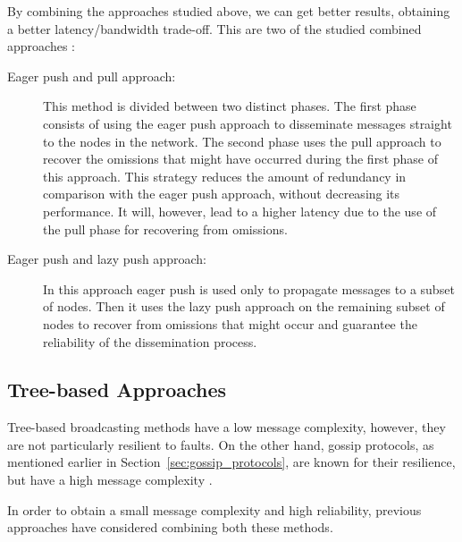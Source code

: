 By combining the approaches studied above, we can get better results, obtaining a better
latency/bandwidth trade-off. This are two of the studied combined approaches \cite{Carvalho2007}:
\begin{description}
      \item[Eager push and pull approach:] This method is divided between two distinct phases.
            The first phase consists of using the eager push approach to disseminate messages
            straight to the nodes in the network. The second phase uses the pull approach to
            recover the omissions that might have occurred during the first phase of this
            approach. This strategy reduces the amount of redundancy in comparison with the
            eager push approach, without decreasing its performance. It will, however, lead to
            a higher latency due to the use of the pull phase for recovering from omissions.
      \item[Eager push and lazy push approach:] In this approach eager push is used only to
            propagate messages to a subset of nodes. Then it uses the lazy push approach on
            the remaining subset of nodes to recover from omissions that might occur and
            guarantee the reliability of the dissemination process.
\end{description}


\subsection{Tree-based Approaches}
\label{subsec:gossip_tree_based_approaches}
Tree-based broadcasting methods have a low message complexity, however, they are not
particularly resilient to faults. On the other hand, gossip protocols, as mentioned earlier
in Section~\ref{sec:gossip_protocols}, are known for their resilience, but have a
high message complexity \cite{Leitao2007Tree}.

In order to obtain a small message complexity and high reliability, previous approaches have
considered combining both these methods.

